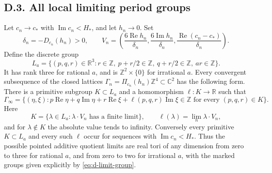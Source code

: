 \subsection{D.3. All local limiting period groups}

\begin{theorem}\label{push:src:D.3.1}
Let \(c_n\to c_*\) with \(\operatorname{Im}c_n<H_*\), and let
\(h_n\to0\). Set
\[
 \delta_n=-D_{c_n}(h_n)>0,\qquad
 V_n=\left(\frac{6\operatorname{Re}h_n}{\delta_n},
           \frac{6\operatorname{Im}h_n}{\delta_n},
           \frac{\operatorname{Re}(c_n-c_*)}{\delta_n}\right).
\]
Define the discrete group
\[
 L_a=\{(p,q,r)\in\mathbb R^3:
    r\in\mathbb Z,\ p+r/2\in\mathbb Z,
    \ q+r/2\in\mathbb Z,\ ar\in\mathbb Z\}.
\]
It has rank three for rational \(a\), and is
\(\mathbb Z^2\times\{0\}\) for irrational \(a\).
Every convergent subsequence of the closed lattices
\(\Gamma_n=\Pi_{c_n}(h_n)\mathbb Z^4\subset\mathbb C^2\) has the
following form. There is a primitive subgroup \(K\subset L_a\) and
a homomorphism \(\ell:K\to\mathbb R\) such that
\begin{equation}\label{eq:d-limit-group}
 \Gamma_\infty=
 \{(\eta,\xi):p\operatorname{Re}\eta+q\operatorname{Im}\eta
       +r\operatorname{Re}\xi+\ell(p,q,r)\operatorname{Im}\xi
       \in\mathbb Z\text{ for every }(p,q,r)\in K\}.
\end{equation}
Here
\[
 K=\{\lambda\in L_a:\lambda\cdot V_n
                      \text{ has a finite limit}\},\qquad
 \ell(\lambda)=\lim_n\lambda\cdot V_n,
\]
and for \(\lambda\notin K\) the absolute value tends to infinity.
Conversely every primitive \(K\subset L_a\) and every such
\(\ell\) occur for sequences with \(\operatorname{Im}c_n<H_*\).
Thus the possible pointed additive quotient limits are real tori of
any dimension from zero to three for rational \(a\), and from zero
to two for irrational \(a\), with the marked groups given explicitly
by \eqref{eq:d-limit-group}.
\end{theorem}
